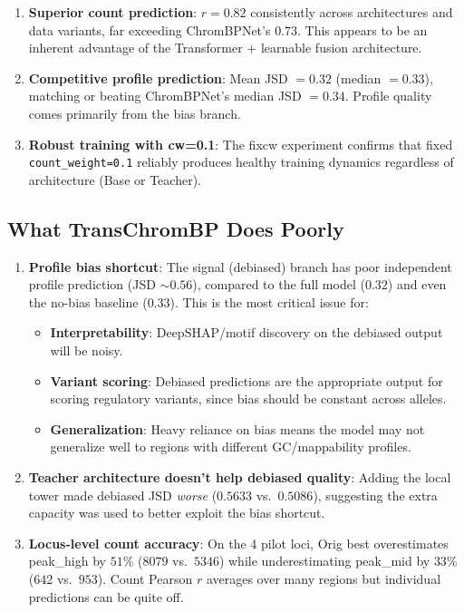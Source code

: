 \documentclass[11pt,a4paper]{article}
\begin{document}
\begin{enumerate}
\item \textbf{Superior count prediction}: $r = 0.82$ consistently across architectures and data variants, far exceeding ChromBPNet's $0.73$. This appears to be an inherent advantage of the Transformer + learnable fusion architecture.

\item \textbf{Competitive profile prediction}: Mean JSD $= 0.32$ (median $= 0.33$), matching or beating ChromBPNet's median JSD $= 0.34$. Profile quality comes primarily from the bias branch.

\item \textbf{Robust training with cw=0.1}: The fixcw experiment confirms that fixed \texttt{count\_weight=0.1} reliably produces healthy training dynamics regardless of architecture (Base or Teacher).
\end{enumerate}

\subsection{What TransChromBP Does Poorly}

\begin{enumerate}
\item \textbf{Profile bias shortcut}: The signal (debiased) branch has poor independent profile prediction (JSD $\sim 0.56$), compared to the full model ($0.32$) and even the no-bias baseline ($0.33$). This is the most critical issue for:
\begin{itemize}
\item \textbf{Interpretability}: DeepSHAP/motif discovery on the debiased output will be noisy.
\item \textbf{Variant scoring}: Debiased predictions are the appropriate output for scoring regulatory variants, since bias should be constant across alleles.
\item \textbf{Generalization}: Heavy reliance on bias means the model may not generalize well to regions with different GC/mappability profiles.
\end{itemize}

\item \textbf{Teacher architecture doesn't help debiased quality}: Adding the local tower made debiased JSD \emph{worse} ($0.5633$ vs.\ $0.5086$), suggesting the extra capacity was used to better exploit the bias shortcut.

\item \textbf{Locus-level count accuracy}: On the 4 pilot loci, Orig best overestimates peak\_high by $51\%$ ($8079$ vs.\ $5346$) while underestimating peak\_mid by $33\%$ ($642$ vs.\ $953$). Count Pearson $r$ averages over many regions but individual predictions can be quite off.
\end{enumerate}
\end{document}
